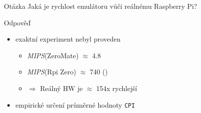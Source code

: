 \documentclass[compress]{beamer}
\begin{document}
\begin{frame}
	\begin{block}{Otázka}
		Jaká je rychlost emulátoru vůči
		reálnému Raspberry Pi?
	\end{block}
	\begin{block}{Odpověď}
		\begin{itemize}
			\item exaktní experiment nebyl proveden
			\begin{itemize}
				\item \textit{MIPS}(ZeroMate) $\approx$ 4.8
				\item \textit{MIPS}(Rpi Zero) $\approx$ 740 (\href{https://www.vut.cz/www_base/zav_prace_soubor_verejne.php?file_id=16089}{})
				\vspace{0.1cm}
				\item $\Rightarrow$ Reálný HW je $\approx$ 154x rychlejší
			\end{itemize}
			\item empirické určení průměrné hodnoty \texttt{CPI}
		\end{itemize}
	\end{block}
\end{frame}
\end{document}
